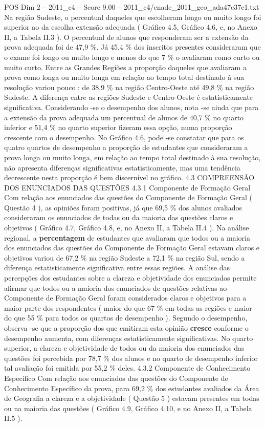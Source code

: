 \begin{textsample}{POS Dim 2 – 2011\_c4 – Score 9.00 – 2011\_c4/enade\_2011\_geo\_ada47c37e1.txt}
Na região Sudeste, o percentual daqueles que escolheram longo ou muito longo foi superior ao da escolha extensão adequada ( Gráfico 4.5, Gráfico 4.6, e, no Anexo II, a Tabela II.3 ).
O percentual de alunos que responderam ser a extensão da prova adequada foi de 47,9 \%.
Já 45,4 \% dos inscritos presentes consideraram que o exame foi longo ou muito longo e menos do que 7 \% o avaliaram como curto ou muito curto.
Entre as Grandes Regiões a proporção daqueles que avaliaram a prova como longa ou muito longa em relação ao tempo total destinado à sua resolução variou pouco : de 38,9 \% na região Centro-Oeste até 49,8 \% na região Sudeste.
A diferença entre as regiões Sudeste e Centro-Oeste é estatisticamente significativa.
Considerando -se o desempenho dos alunos, nota -se ainda que para a extensão da prova adequada um percentual de alunos de 40,7 \% no quarto inferior e 51,4 \% no quarto superior fizeram essa opção, numa proporção crescente com o desempenho.
No Gráfico 4.6, pode -se constatar que para os quatro quartos de desempenho a proporção de estudantes que consideraram a prova longa ou muito longa, em relação ao tempo total destinado à sua resolução, não apresenta diferenças significativas estatisticamente, mas uma tendência decrescente nesta proporção é bem discernível no gráfico. 4.3 COMPREENSÃO DOS ENUNCIADOS DAS QUESTÕES 4.3.1 Componente de Formação Geral Com relação aos enunciados das questões do Componente de Formação Geral ( Questão 4 ), as opiniões foram positivas, já que 69,5 \% dos alunos avaliados consideraram os enunciados de todas ou da maioria das questões claros e objetivos ( Gráfico 4.7, Gráfico 4.8, e, no Anexo II, a Tabela II.4 ).
Na análise regional, a \textbf{percentagem} de estudantes que avaliaram que todos ou a maioria dos enunciados das questões do Componente de Formação Geral estavam claros e objetivos variou de 67,2 \% na região Sudeste a 72,1 \% na região Sul, sendo a diferença estatisticamente significativa entre essas regiões.
A análise das percepções dos estudantes sobre a clareza e objetividade dos enunciados permite afirmar que todos ou a maioria dos enunciados de questões relativas ao Componente de Formação Geral foram considerados claros e objetivos para a maior parte dos respondentes ( maior do que 67 \% em todas as regiões e maior do que 55 \% para todos os quartos de desempenho ).
Segundo o desempenho, observa -se que a proporção dos que emitiram esta opinião \textbf{cresce} conforme o desempenho aumenta, com diferenças estatisticamente significativas.
No quarto superior, a clareza e objetividade de todos ou da maioria dos enunciados das questões foi percebida por 78,7 \% dos alunos e no quarto de desempenho inferior tal avaliação foi emitida por 55,2 \% deles. 4.3.2 Componente de Conhecimento Específico Com relação aos enunciados das questões do Componente de Conhecimento Específico da prova, para 69,2 \% dos estudantes avaliados da Área de Geografia a clareza e a objetividade ( Questão 5 ) estavam presentes em todas ou na maioria das questões ( Gráfico 4.9, Gráfico 4.10, e no Anexo II, a Tabela II.5 ).

\end{textsample}

